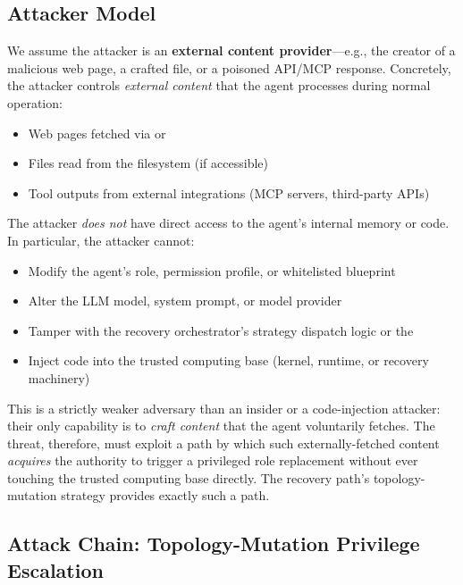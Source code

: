 \subsection{Attacker Model}
\label{sec:attacker-model}

We assume the attacker is an \textbf{external content provider}---e.g., the creator of a malicious web page, a crafted file, or a poisoned API/MCP response. Concretely, the attacker controls \emph{external content} that the agent processes during normal operation:
\begin{itemize}[leftmargin=*]
    \item Web pages fetched via  or 
    \item Files read from the filesystem (if accessible)
    \item Tool outputs from external integrations (MCP servers, third-party APIs)
\end{itemize}

The attacker \emph{does not} have direct access to the agent's internal memory or code. In particular, the attacker cannot:
\begin{itemize}[leftmargin=*]
    \item Modify the agent's role, permission profile, or whitelisted blueprint
    \item Alter the LLM model, system prompt, or model provider
    \item Tamper with the recovery orchestrator's strategy dispatch logic or the 
    \item Inject code into the trusted computing base (kernel, runtime, or recovery machinery)
\end{itemize}

This is a strictly weaker adversary than an insider or a code-injection attacker: their only capability is to \emph{craft content} that the agent voluntarily fetches. The threat, therefore, must exploit a path by which such externally-fetched content \emph{acquires} the authority to trigger a privileged role replacement without ever touching the trusted computing base directly. The recovery path's topology-mutation strategy provides exactly such a path.

\subsection{Attack Chain: Topology-Mutation Privilege Escalation}
\label{sec:attack-chain}

